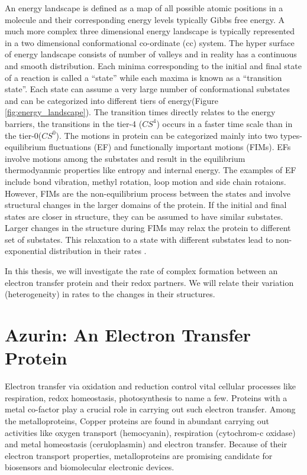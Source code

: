 An energy landscape is defined as a map of all possible atomic positions in a molecule and their corresponding energy levels typically Gibbs free energy.
A much more complex three dimensional energy landscape is typically represented in a two dimensional conformational co-ordinate (cc) system.
The hyper surface of energy landscape consists of number of valleys and in reality has a continuous and smooth distribution.
Each minima corresponding to the initial and final state of a reaction is called a ``state'' while each maxima is known as a ``transition state''.
Each state can assume a very large number of conformational substates and can be categorized into different tiers of energy(Figure \ref{fig:energy_landscape}).
The transition times directly relates to the energy barriers, the transitions in the tier-4 ($CS^4$) occurs in a faster time scale than in the tier-0($CS^0$).
The motions in protein can be categorized mainly into two types- equilibrium fluctuations (EF) and  functionally important motions (FIMs).\cite{ansari1985protein}
EFs involve motions among the substates and result in the equilibrium thermodyanmic properties like entropy and internal energy. 
The examples of EF include bond vibration, methyl rotation, loop motion and side chain rotaions.
However, FIMs are the non-equilibrium process between the states and involve structural changes in the larger domains of the protein.
If the initial and final states are closer in structure, they can be assumed to have similar substates. 
Larger changes in the structure during FIMs may relax the protein to different set of substates. This relaxation to a state with different substates lead to non-exponential distribution in their rates .

In this thesis, we will investigate the rate of complex formation between an electron transfer protein and their redox partners. We will relate their variation (heterogeneity) in rates to the changes in their structures.

\section{Azurin: An Electron Transfer Protein}
Electron transfer via oxidation and reduction control vital cellular processes like respiration, redox homeostasis, photosynthesis to name a few.
Proteins with a metal co-factor play a crucial role in carrying out such electron transfer.
Among the metalloproteins, Copper proteins are found in abundant carrying out activities like oxygen transport (hemocyanin), respiration (cytochrom-c oxidase) and metal homeostasis (ceruloplasmin) and electron transfer.
Because of their electron transport properties, metalloproteins are promising candidate for biosensors and biomolecular electronic devices.

